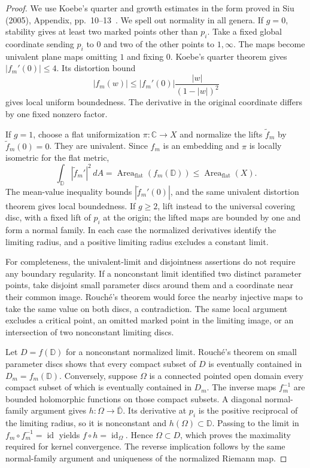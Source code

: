 \begin{proof}
We use Koebe's quarter and growth estimates in the form proved in Siu (2005), Appendix, pp.~10--13~\cite{C_Siu2005}. We spell out normality in all genera. If $g=0$, stability gives at least two marked points other than $p_i$. Take a fixed global coordinate sending $p_i$ to $0$ and two of the other points to $1,\infty$. The maps become univalent plane maps omitting $1$ and fixing $0$. Koebe's quarter theorem gives $|f_m'(0)|\leq4$. Its distortion bound
\[
 |f_m(w)|\leq |f_m'(0)|\frac{|w|}{(1-|w|)^2}
\]
gives local uniform boundedness. The derivative in the original coordinate differs by one fixed nonzero factor.

If $g=1$, choose a flat uniformization $\pi:\mathbb C\to X$ and normalize the lifts $\tilde f_m$ by $\tilde f_m(0)=0$. They are univalent. Since $f_m$ is an embedding and $\pi$ is locally isometric for the flat metric,
\[
 \int_{\mathbb D}|\tilde f_m'|^2\,dA
 =\operatorname{Area}_{\mathrm{flat}}(f_m(\mathbb D))
 \leq\operatorname{Area}_{\mathrm{flat}}(X).
\]
The mean-value inequality bounds $|\tilde f_m'(0)|$, and the same univalent distortion theorem gives local boundedness. If $g\geq2$, lift instead to the universal covering disc, with a fixed lift of $p_i$ at the origin; the lifted maps are bounded by one and form a normal family. In each case the normalized derivatives identify the limiting radius, and a positive limiting radius excludes a constant limit.

For completeness, the univalent-limit and disjointness assertions do not require any boundary regularity. If a nonconstant limit identified two distinct parameter points, take disjoint small parameter discs around them and a coordinate near their common image. Rouch\'e's theorem would force the nearby injective maps to take the same value on both discs, a contradiction. The same local argument excludes a critical point, an omitted marked point in the limiting image, or an intersection of two nonconstant limiting discs.

Let $D=f(\mathbb D)$ for a nonconstant normalized limit. Rouch\'e's theorem on small parameter discs shows that every compact subset of $D$ is eventually contained in $D_m=f_m(\mathbb D)$. Conversely, suppose $\Omega$ is a connected pointed open domain every compact subset of which is eventually contained in $D_m$. The inverse maps $f_m^{-1}$ are bounded holomorphic functions on those compact subsets. A diagonal normal-family argument gives $h:\Omega\to\overline{\mathbb D}$. Its derivative at $p_i$ is the positive reciprocal of the limiting radius, so it is nonconstant and $h(\Omega)\subset\mathbb D$. Passing to the limit in $f_m\circ f_m^{-1}=\operatorname{id}$ yields $f\circ h=\operatorname{id}_\Omega$. Hence $\Omega\subset D$, which proves the maximality required for kernel convergence. The reverse implication follows by the same normal-family argument and uniqueness of the normalized Riemann map.
\end{proof}


